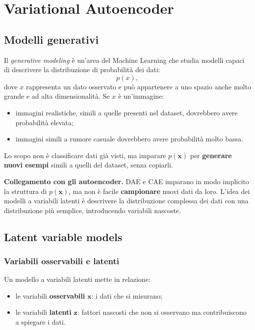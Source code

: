 \documentclass[11pt,a4paper]{article}
\begin{document}
\section{Variational Autoencoder}

\subsection{Modelli generativi}

Il \textit{generative modeling} è un'area del Machine Learning che studia modelli capaci di descrivere la 
distribuzione di probabilità dei dati:
\[p(x),\]
dove $x$ rappresenta un dato osservato e può appartenere a uno spazio anche 
molto grande e ad alta dimensionalità. Se $x$ è un'immagine:
\begin{itemize}
    \item immagini realistiche, simili a quelle presenti nel dataset, dovrebbero avere probabilità elevata;
    \item immagini simili a rumore casuale dovrebbero avere probabilità molto bassa.
\end{itemize}

Lo scopo non è classificare dati già visti, ma imparare $p(\mathbf{x})$ per
\textbf{generare nuovi esempi} simili a quelli del dataset, senza copiarli.

\begin{osservazione}
  \textbf{Collegamento con gli autoencoder.} DAE e CAE imparano in modo implicito
  la struttura di $p(\mathbf{x})$, ma non è facile \textbf{campionare} nuovi dati
  da loro. L'idea dei modelli a variabili latenti è descrivere la distribuzione
  complessa dei dati con una distribuzione più semplice, introducendo variabili
  nascoste.
\end{osservazione}

\subsection{Latent variable models}

\subsubsection{Variabili osservabili e latenti}
Un modello a variabili latenti mette in relazione:
\begin{itemize}
  \item le variabili \textbf{osservabili} $\mathbf{x}$: i dati che si misurano;
  \item le variabili \textbf{latenti} $\mathbf{z}$: fattori nascosti che non si
        osservano ma contribuiscono a spiegare i dati.
\end{itemize}
\end{document}
